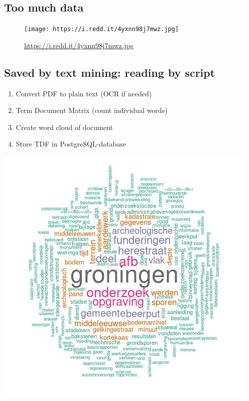 \documentclass[
  letterpaper,
  DIV=11,
  numbers=noendperiod]{scrartcl}
\providecommand{\tightlist}{%
  \setlength{\itemsep}{0pt}\setlength{\parskip}{0pt}}\usepackage{longtable,booktabs,array}
\begin{document}
\hypertarget{too-much-data}{%
\subsection{Too much data}\label{too-much-data}}

\begin{figure}

{\centering \texttt{[image: https://i.redd.it/4yxnn98j7mwz.jpg]}

}

\caption{\url{https://i.redd.it/4yxnn98j7mwz.jpg}}

\end{figure}

\hypertarget{saved-by-text-mining-reading-by-script}{%
\subsection{Saved by text mining: reading by
script}\label{saved-by-text-mining-reading-by-script}}

\begin{enumerate}
\def\labelenumi{\arabic{enumi}.}
\tightlist
\item
  Convert PDF to plain text (OCR if needed)
\item
  Term Document Matrix (count individual words)
\item
  Create word cloud of document
\item
  Store TDF in PostgreSQL-database
\end{enumerate}

\includegraphics{images/2044012100_Groningen_Herestraat_wordcloud.jpg}
\end{document}

